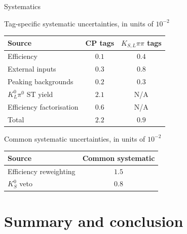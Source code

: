 \documentclass{beamer}
\begin{document}
\begin{frame}{Systematics}
  \begin{center}
    \def\arraystretch{1.2}%
    Tag-specific systematic uncertainties, in units of $10^{-2}$ \\
    \begin{tabular}{lcc}
      \hline
      Source                   & CP tags & $K_{S, L}\pi\pi$ tags \\
      \hline
      Efficiency               & $0.1$   & $0.4$ \\
      External inputs          & $0.3$   & $0.8$ \\
      Peaking backgrounds      & $0.2$   & $0.3$ \\
      $K^0_L\pi^0$ ST yield    & $2.1$   & N/A \\
      Efficiency factorisation & $0.6$   & N/A \\
      \hline
      Total                    & $2.2$   & $0.9$ \\
      \hline
    \end{tabular}
  \end{center}
  \begin{center}
    \def\arraystretch{1.2}%
    Common systematic uncertainties, in units of $10^{-2}$ \\
    \begin{tabular}{lc}
      \hline
      Source                 & Common systematic \\
      \hline
      Efficiency reweighting & $1.5$ \\
      $K^0_S$ veto           & $0.8$ \\
      \hline
    \end{tabular}
  \end{center}
\end{frame}

\section{Summary and conclusion}
\end{document}

